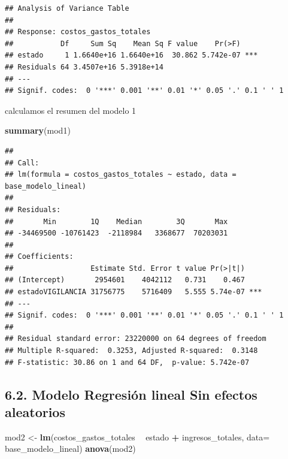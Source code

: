 \documentclass[
  11pt,
]{book}
\newenvironment{Shaded}{\begin{snugshade}}{\end{snugshade}}
\newcommand{\DataTypeTok}[1]{\textcolor[rgb]{0.13,0.29,0.53}{#1}}
\newcommand{\KeywordTok}[1]{\textcolor[rgb]{0.13,0.29,0.53}{\textbf{#1}}}
\newcommand{\NormalTok}[1]{#1}
\newcommand{\OperatorTok}[1]{\textcolor[rgb]{0.81,0.36,0.00}{\textbf{#1}}}
\newcommand{\StringTok}[1]{\textcolor[rgb]{0.31,0.60,0.02}{#1}}
\begin{document}
\begin{verbatim}
## Analysis of Variance Table
## 
## Response: costos_gastos_totales
##           Df     Sum Sq    Mean Sq F value    Pr(>F)    
## estado     1 1.6640e+16 1.6640e+16  30.862 5.742e-07 ***
## Residuals 64 3.4507e+16 5.3918e+14                      
## ---
## Signif. codes:  0 '***' 0.001 '**' 0.01 '*' 0.05 '.' 0.1 ' ' 1
\end{verbatim}

calculamos el resumen del modelo 1

\begin{Shaded}
\begin{Highlighting}[]
\KeywordTok{summary}\NormalTok{(mod1)}
\end{Highlighting}
\end{Shaded}

\begin{verbatim}
## 
## Call:
## lm(formula = costos_gastos_totales ~ estado, data = base_modelo_lineal)
## 
## Residuals:
##       Min        1Q    Median        3Q       Max 
## -34469500 -10761423  -2118984   3368677  70203031 
## 
## Coefficients:
##                  Estimate Std. Error t value Pr(>|t|)    
## (Intercept)       2954601    4042112   0.731    0.467    
## estadoVIGILANCIA 31756775    5716409   5.555 5.74e-07 ***
## ---
## Signif. codes:  0 '***' 0.001 '**' 0.01 '*' 0.05 '.' 0.1 ' ' 1
## 
## Residual standard error: 23220000 on 64 degrees of freedom
## Multiple R-squared:  0.3253, Adjusted R-squared:  0.3148 
## F-statistic: 30.86 on 1 and 64 DF,  p-value: 5.742e-07
\end{verbatim}

\hypertarget{modelo-regresiuxf3n-lineal-sin-efectos-aleatorios}{%
\subsection{6.2. Modelo Regresión lineal Sin efectos
aleatorios}\label{modelo-regresiuxf3n-lineal-sin-efectos-aleatorios}}

\begin{Shaded}
\begin{Highlighting}[]
\NormalTok{mod2 <-}\StringTok{ }\KeywordTok{lm}\NormalTok{(costos_gastos_totales }\OperatorTok{~}\StringTok{ }\NormalTok{estado }\OperatorTok{+}\StringTok{ }\NormalTok{ingresos_totales, }
           \DataTypeTok{data=}\NormalTok{ base_modelo_lineal) }
\KeywordTok{anova}\NormalTok{(mod2)}
\end{Highlighting}
\end{Shaded}
\end{document}
